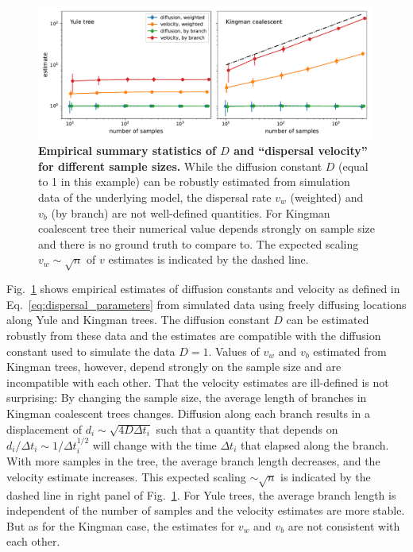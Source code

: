 \documentclass[aps,rmp, twocolumn]{revtex4}
\begin{document}
\begin{figure}[tb]
    \includegraphics*[width=0.99\textwidth]{figures/dispersal_stats.pdf}
    \caption{\label{fig:D_and_v}{\bf Empirical summary statistics of $D$ and ``dispersal velocity'' for different sample sizes.}
    While the diffusion constant $D$ (equal to 1 in this example) can be robustly estimated from simulation data of the underlying model, the dispersal rate $v_w$ (weighted) and $v_b$ (by branch) are not well-defined quantities. For Kingman coalescent tree their numerical value depends strongly on sample size and there is no ground truth to compare to. The expected scaling $v_w \sim \sqrt{n}$ of $v$ estimates is indicated by the dashed line.}
\end{figure}


Fig.~\ref{fig:D_and_v} shows empirical estimates of diffusion constants and velocity as defined in Eq.~\ref{eq:dispersal_parameters} from simulated data using freely diffusing locations along Yule and Kingman trees.
The diffusion constant $D$ can be estimated robustly from these data and the estimates are compatible with the diffusion constant used to simulate the data $D=1$.
Values of $v_w$ and $v_b$ estimated from Kingman trees, however, depend strongly on the sample size and are incompatible with each other.
That the velocity estimates are ill-defined is not surprising: By changing the sample size, the average length of branches in Kingman coalescent trees changes.
Diffusion along each branch results in a displacement of $d_i \sim \sqrt{4D\Delta t_i}$ such that a quantity that depends on $d_i / \Delta t_i \sim 1/\Delta t_i^{1/2}$ will change with the time $\Delta t_i$ that elapsed along the branch.
With more samples in the tree, the average branch length decreases, and the velocity estimate increases.
This expected scaling $\sim \sqrt{n}$ is indicated by the dashed line in right panel of Fig.~\ref{fig:D_and_v}.
For Yule trees, the average branch length is independent of the number of samples and the velocity estimates are more stable.
But as for the Kingman case, the estimates for $v_w$ and $v_b$ are not consistent with each other.
\end{document}
